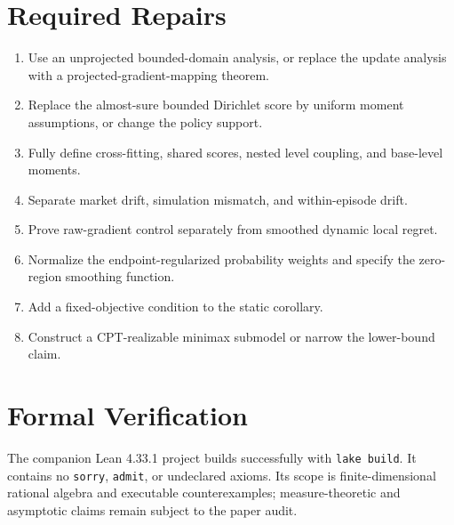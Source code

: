 \documentclass[11pt]{article}
\begin{document}
\section*{Required Repairs}
\begin{enumerate}
\item Use an unprojected bounded-domain analysis, or replace the update analysis with a projected-gradient-mapping theorem.
\item Replace the almost-sure bounded Dirichlet score by uniform moment assumptions, or change the policy support.
\item Fully define cross-fitting, shared scores, nested level coupling, and base-level moments.
\item Separate market drift, simulation mismatch, and within-episode drift.
\item Prove raw-gradient control separately from smoothed dynamic local regret.
\item Normalize the endpoint-regularized probability weights and specify the zero-region smoothing function.
\item Add a fixed-objective condition to the static corollary.
\item Construct a CPT-realizable minimax submodel or narrow the lower-bound claim.
\end{enumerate}

\section*{Formal Verification}
The companion Lean 4.33.1 project builds successfully with \texttt{lake build}. It contains no \texttt{sorry}, \texttt{admit}, or undeclared axioms. Its scope is finite-dimensional rational algebra and executable counterexamples; measure-theoretic and asymptotic claims remain subject to the paper audit.
\end{document}
